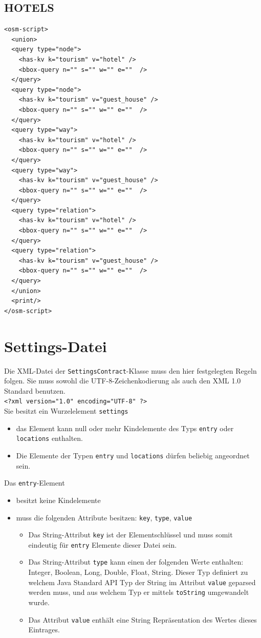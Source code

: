 \documentclass[10pt]{scrreprt}
\begin{document}
\subsection*{HOTELS}
\begin{lstlisting}
<osm-script>
  <union>
  <query type="node">
    <has-kv k="tourism" v="hotel" />
    <bbox-query n="" s="" w="" e=""  />
  </query>
  <query type="node">
    <has-kv k="tourism" v="guest_house" />
    <bbox-query n="" s="" w="" e=""  />
  </query>
  <query type="way">
    <has-kv k="tourism" v="hotel" />
    <bbox-query n="" s="" w="" e=""  />
  </query>
  <query type="way">
    <has-kv k="tourism" v="guest_house" />
    <bbox-query n="" s="" w="" e=""  />
  </query>
  <query type="relation">
    <has-kv k="tourism" v="hotel" />
    <bbox-query n="" s="" w="" e=""  />
  </query>
  <query type="relation">
    <has-kv k="tourism" v="guest_house" />
    <bbox-query n="" s="" w="" e=""  />
  </query>
  </union>
  <print/>
</osm-script>
\end{lstlisting}

\newpage

\section{Settings-Datei}
Die XML-Datei der \texttt{SettingsContract}-Klasse muss den hier festgelegten Regeln folgen.
Sie muss sowohl die UTF-8-Zeichenkodierung als auch den XML 1.0 Standard benutzen. \\
\texttt{<?xml version="{}1.0"{} encoding="{}UTF-8"{} ?>} \\
Sie besitzt ein Wurzelelement \texttt{settings}
\begin{itemize}
 \item das Element kann null oder mehr Kindelemente des Typs \texttt{entry} oder \texttt{locations} enthalten.
 \item Die Elemente der Typen \texttt{entry} und \texttt{locations} dürfen beliebig angeordnet sein.
\end{itemize}

Das \texttt{entry}-Element
\begin{itemize}
 \item besitzt keine Kindelemente
 \item muss die folgenden Attribute besitzen: \texttt{key}, \texttt{type}, \texttt{value}
 \begin{itemize}
 \item Das String-Attribut \texttt{key} ist der Elementschlüssel und muss somit eindeutig für \texttt{entry} Elemente dieser Datei sein.
 \item Das String-Attribut \texttt{type} kann einen der folgenden Werte enthalten: Integer, Boolean, Long, Double, Float, String.
  Dieser Typ definiert zu welchem Java Standard API Typ der String im Attribut \texttt{value} geparsed werden muss, und aus welchem Typ er mittels \texttt{toString} umgewandelt wurde.
   \item Das Attribut \texttt{value} enthält eine String Repräsentation des Wertes dieses Eintrages.
 \end{itemize}
\end{itemize}
\end{document}
